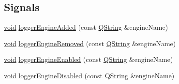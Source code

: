 \subsection*{Signals}
\begin{DoxyCompactItemize}
\item 
\hyperlink{group___u_a_v_objects_plugin_ga444cf2ff3f0ecbe028adce838d373f5c}{void} \hyperlink{class_qxt_logger_ac91bc1c3b969456929498e82f6457c20}{logger\-Engine\-Added} (const \hyperlink{group___u_a_v_objects_plugin_gab9d252f49c333c94a72f97ce3105a32d}{Q\-String} \&engine\-Name)
\item 
\hyperlink{group___u_a_v_objects_plugin_ga444cf2ff3f0ecbe028adce838d373f5c}{void} \hyperlink{class_qxt_logger_af5b68e137d47ac9c16e8c21178d66aeb}{logger\-Engine\-Removed} (const \hyperlink{group___u_a_v_objects_plugin_gab9d252f49c333c94a72f97ce3105a32d}{Q\-String} \&engine\-Name)
\item 
\hyperlink{group___u_a_v_objects_plugin_ga444cf2ff3f0ecbe028adce838d373f5c}{void} \hyperlink{class_qxt_logger_af1d2c5abd8388df08c67b448735c86b6}{logger\-Engine\-Enabled} (const \hyperlink{group___u_a_v_objects_plugin_gab9d252f49c333c94a72f97ce3105a32d}{Q\-String} \&engine\-Name)
\item 
\hyperlink{group___u_a_v_objects_plugin_ga444cf2ff3f0ecbe028adce838d373f5c}{void} \hyperlink{class_qxt_logger_abc4b1ba1c9e127938e4bd899c7b119d0}{logger\-Engine\-Disabled} (const \hyperlink{group___u_a_v_objects_plugin_gab9d252f49c333c94a72f97ce3105a32d}{Q\-String} \&engine\-Name)
\end{DoxyCompactItemize}

